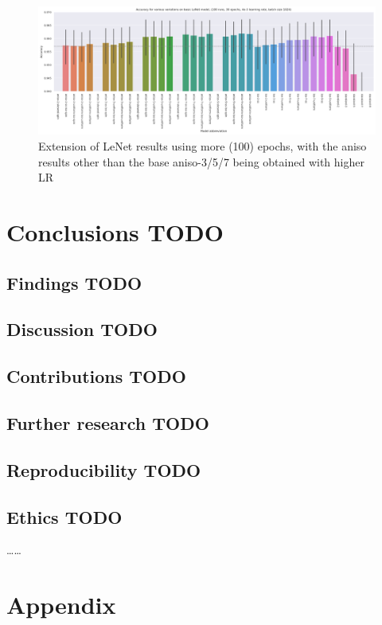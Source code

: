 \documentclass[a4paper, 12pt]{report}
\def\comment#1{\color{red}#1\color{black}}
\begin{document}
\begin{figure}[h!]
	\center
  \includegraphics[width=\textwidth]{figures/100ep_extension.png}
  \caption{Extension of LeNet results using more (100) epochs, with the aniso results other than the base aniso-3/5/7 being obtained with higher LR}
  \label{fig:res3}
\end{figure}


\chapter{Conclusions \comment{TODO}}

\section{Findings \comment{TODO}}
\section{Discussion \comment{TODO}}
\section{Contributions \comment{TODO}}
\section{Further research \comment{TODO}}

\section{Reproducibility \comment{TODO}}
\section{Ethics \comment{TODO}}
\comment{\ldots\ldots}




\newpage
\chapter{Appendix}
\end{document}
